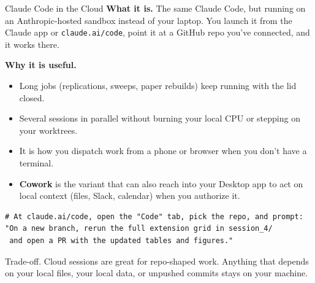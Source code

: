 \documentclass[aspectratio=169, 11pt]{beamer}
\begin{document}
\begin{frame}[fragile]{Claude Code in the Cloud}
  \textbf{What it is.} The same Claude Code, but running on an Anthropic-hosted sandbox instead of your laptop. You launch it from the Claude app or \texttt{claude.ai/code}, point it at a GitHub repo you've connected, and it works there.

  \vspace{0.4em}
  \textbf{Why it is useful.}
  \begin{itemize}\small
    \item Long jobs (replications, sweeps, paper rebuilds) keep running with the lid closed.
    \item Several sessions in parallel without burning your local CPU or stepping on your worktrees.
    \item It is how you dispatch work from a phone or browser when you don't have a terminal.
    \item \textbf{Cowork} is the variant that can also reach into your Desktop app to act on local context (files, Slack, calendar) when you authorize it.
  \end{itemize}

  \vspace{0.3em}
  \begin{lstlisting}[basicstyle=\ttfamily\footnotesize]
# At claude.ai/code, open the "Code" tab, pick the repo, and prompt:
"On a new branch, rerun the full extension grid in session_4/
 and open a PR with the updated tables and figures."
  \end{lstlisting}

  \vspace{0.2em}
  {\small \alert{Trade-off.} Cloud sessions are great for repo-shaped work. Anything that depends on your local files, your local data, or unpushed commits stays on your machine.}
\end{frame}

\end{document}
